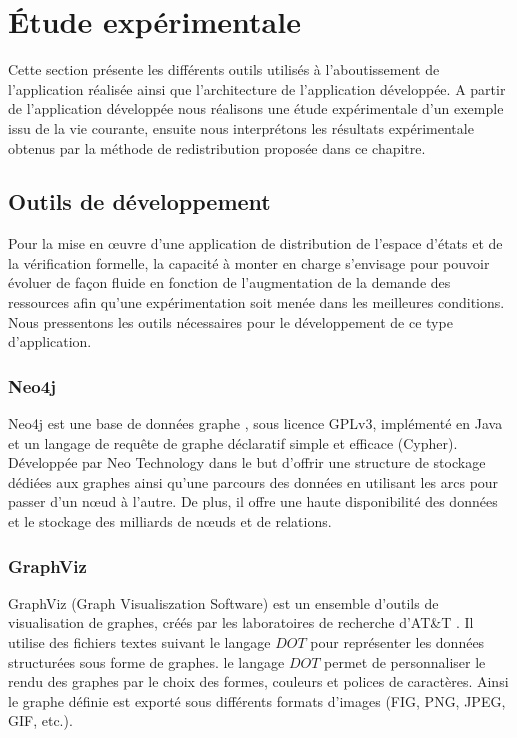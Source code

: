 \section{Étude expérimentale}
Cette section présente les différents outils utilisés à l'aboutissement de l'application réalisée ainsi que l'architecture de l'application développée.
A partir de l'application développée nous réalisons une étude expérimentale d'un exemple issu de la vie courante, ensuite nous interprétons les résultats expérimentale obtenus par la méthode de redistribution proposée dans ce chapitre.

\subsection{Outils de développement}
Pour la mise en œuvre d’une application de distribution de l'espace d'états et de la vérification formelle, la capacité à monter en charge s’envisage pour pouvoir évoluer de façon fluide en fonction de l'augmentation de la demande des ressources afin qu'une expérimentation soit menée dans les meilleures conditions. Nous pressentons les outils nécessaires pour le développement de ce type d'application. 
\subsubsection*{Neo4j}
Neo4j est une base de données graphe \citep{neo4j}, sous licence GPLv3, implémenté en Java et un langage de requête de graphe déclaratif simple et efficace (Cypher). Développée par Neo Technology dans le but d'offrir une structure de stockage dédiées aux  graphes ainsi qu'une parcours des données en utilisant les arcs pour passer d'un nœud à l'autre. De plus, il offre une haute disponibilité des données et le stockage des milliards de nœuds et de relations.
\subsubsection*{GraphViz}
GraphViz (Graph Visualiszation Software) est un ensemble d'outils de visualisation de graphes, créés par les laboratoires de recherche d'AT\&T \citep{graphviz}. Il utilise des fichiers textes suivant le langage $DOT$ pour représenter les données structurées sous forme de graphes. le langage $DOT$ permet  de personnaliser le rendu des graphes par le choix des formes, couleurs et polices de caractères. Ainsi le graphe définie est exporté sous différents formats d'images (FIG, PNG, JPEG, GIF, etc.).

